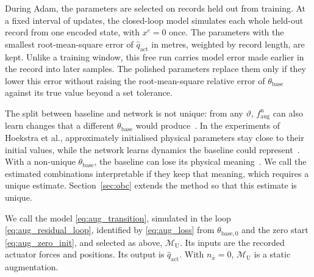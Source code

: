 During Adam, the parameters are selected on records held out from training.
At a fixed interval of updates, the closed-loop model simulates each whole
held-out record from one encoded state, with $x^c=0$ once.
The parameters with the smallest root-mean-square error of
$\hat q_{\mathrm{act}}$ in metres, weighted by record length, are kept.
Unlike a training window, this free run carries model error made earlier in
the record into later samples.
The polished parameters replace them only if they lower this error without
raising the root-mean-square relative error of $\theta_{\mathrm{base}}$ against
its true value beyond a set tolerance.

The split between baseline and network is not unique: from any $\vartheta$,
$f^{\mathrm n}_{\mathrm{aug}}$ can also learn changes that a different
$\theta_{\mathrm{base}}$ would produce~\cite[Sec.~5.2]{hoekstra2026lfr}.
In the experiments of Hoekstra et al., approximately initialised physical
parameters stay close to their initial values, while the network learns
dynamics the baseline could represent~\cite[Sec.~6.3]{hoekstra2026lfr}.
With a non-unique $\theta_{\mathrm{base}}$, the baseline can lose its physical
meaning~\cite[Sec.~3]{gyorok2026obc}.
We call the estimated combinations interpretable if they keep that meaning,
which requires a unique estimate.
Section~\ref{sec:obc} extends the method so that this estimate is unique.

We call the model \eqref{eq:aug_transition}, simulated in the loop
\eqref{eq:aug_residual_loop}, identified by \eqref{eq:aug_loss} from
$\theta_{\mathrm{base},0}$ and the zero start \eqref{eq:aug_zero_init}, and
selected as above, $\mathcal M_{\mathrm U}$.
Its inputs are the recorded actuator forces and positions.
Its output is $\hat q_{\mathrm{act}}$.
With $n_{\bar x}=0$, $\mathcal M_{\mathrm U}$ is a static augmentation.

